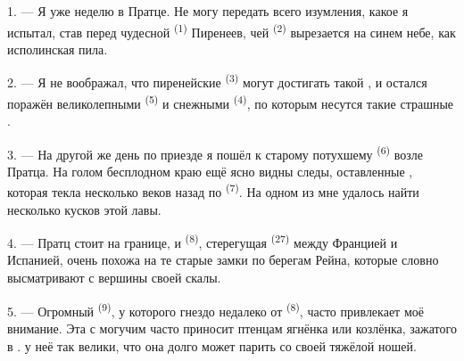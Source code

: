 
\VUsaut{4.0mm}
\VUsaut{3.0mm}

\VUsaut{3.0mm}

\VUsaut{3.0mm}

1. --- Я уже неделю в Пратце. Не могу передать всего изумления, какое я
испытал, став перед чудесной  \textsuperscript{(1)} Пиренеев,
чей  \textsuperscript{(2)} вырезается на синем небе, как
исполинская пила.

2. --- Я не воображал, что пиренейские  \textsuperscript{(3)}
могут достигать такой , и остался поражён великолепными
 \textsuperscript{(5)} и снежными 
\textsuperscript{(4)}, по которым несутся такие страшные .

\VUsaut{3.0mm}
\VUsaut{3.0mm}

3. --- На другой же день по приезде я пошёл к старому потухшему
 \textsuperscript{(6)} возле Пратца. На голом бесплодном краю
 ещё ясно видны следы, оставленные , которая
текла несколько веков назад по  \textsuperscript{(7)}. На
одном из  мне удалось найти несколько кусков этой лавы.

4. --- Пратц стоит на границе, и  \textsuperscript{(8)},
стерегущая  \textsuperscript{(27)} между Францией и Испанией,
очень похожа на те старые замки по берегам Рейна, которые словно
высматривают  с вершины своей скалы.

5. --- Огромный  \textsuperscript{(9)}, у которого гнездо недалеко
от  \textsuperscript{(8)}, часто привлекает моё внимание. Эта
 с могучим  часто приносит птенцам
ягнёнка или козлёнка, зажатого в .  у неё
так велики, что она долго может парить со своей тяжёлой ношей.

